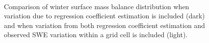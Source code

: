 \documentclass[12pt]{article}
\begin{document}
\begin{figure}[H]
	\centering
	\\
	\caption{Comparison of winter surface mass balance distribution when variation due to regression coefficient estimation is included (dark) and when variation from both regression coefficient estimation and observed SWE variation within a grid cell is included (light). }
	\label{fig:WSMB_compareBetaAndZZBeta}
\end{figure}








\end{document}
